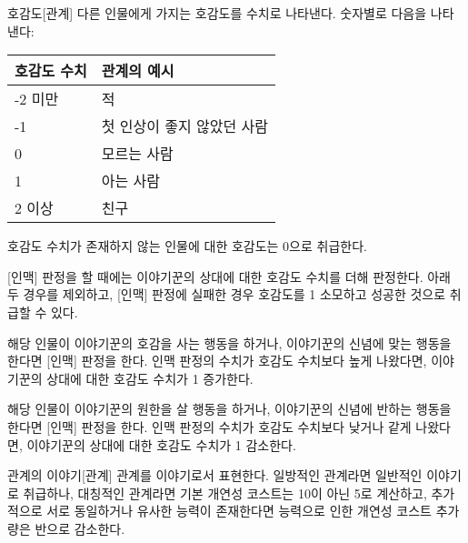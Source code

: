 \documentclass{report}
\begin{document}
	\begin{story}{호감도}{[관계]}
		다른 인물에게 가지는 호감도를 수치로 나타낸다. 숫자별로 다음을 나타낸다:
		
		\begin{tabularx}{\textwidth}{l|X}
			호감도 수치 & 관계의 예시\\
			\hline
			\hline
			-2 미만     & 적\\
			\hline
			-1          & 첫 인상이 좋지 않았던 사람\\
			\hline
			0           & 모르는 사람\\
			\hline
			1           & 아는 사람\\
			\hline
			2 이상      & 친구\\
		\end{tabularx}
		
		호감도 수치가 존재하지 않는 인물에 대한 호감도는 0으로 취급한다.
		
		[인맥] 판정을 할 때에는 이야기꾼의 상대에 대한 호감도 수치를 더해 판정한다. 아래 두 경우를 제외하고, [인맥] 판정에 실패한 경우 호감도를 1 소모하고 성공한 것으로 취급할 수 있다.
		
		해당 인물이 이야기꾼의 호감을 사는 행동을 하거나, 이야기꾼의 신념에 맞는 행동을 한다면 [인맥] 판정을 한다. 인맥 판정의 수치가 호감도 수치보다 높게 나왔다면, 이야기꾼의 상대에 대한 호감도 수치가 1 증가한다.
		
		해당 인물이 이야기꾼의 원한을 살 행동을 하거나, 이야기꾼의 신념에 반하는 행동을 한다면 [인맥] 판정을 한다. 인맥 판정의 수치가 호감도 수치보다 낮거나 같게 나왔다면, 이야기꾼의 상대에 대한 호감도 수치가 1 감소한다.
	\end{story}

	\begin{story}{관계의 이야기}{[관계]}
		관계를 이야기로서 표현한다. 일방적인 관계라면 일반적인 이야기로 취급하나, 대칭적인 관계라면 기본 개연성 코스트는 10이 아닌 5로 계산하고, 추가적으로 서로 동일하거나 유사한 능력이 존재한다면 능력으로 인한 개연성 코스트 추가량은 반으로 감소한다.
	\end{story}
\end{document}
